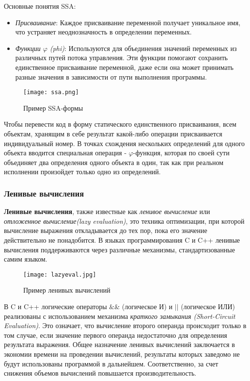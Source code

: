 Основные понятия SSA:
\begin{itemize}
    \item \textit{Присваивание}: Каждое присваивание переменной получает уникальное имя, что устраняет неоднозначность в определении переменных.
    \item \textit{Функции $\varphi$ (phi)}: Используются для объединения значений переменных из различных путей потока управления. Эти функции помогают сохранить единственное присваивание переменной, даже если она может принимать разные значения в зависимости от пути выполнения программы.
\end{itemize}

\begin{figure}[!htb]
    \centering
    \texttt{[image: ssa.png]}
    \caption{Пример SSA-формы}
\end{figure}

Чтобы перевести код в форму статического единственного присваивания, всем объектам, хранящим в себе результат какой-либо операции присваивается индивидуальный номер. В точках схождения нескольких определений для одного объекта вводится специальная операция - $\varphi$-функция, которая по своей сути объединяет два определения одного объекта в один, так как при реальном исполнении  произойдет только одно из определений.

\subsubsection{Ленивые вычисления}

\textbf{Ленивые вычисления}, также известные как \textit{ленивое вычисление} или \textit{отложенное вычисление(lazy evaluation)}, это техника оптимизации, при которой вычисление выражения откладывается до тех пор, пока его значение действительно не понадобится. В языках программирования C и C++ ленивые вычисления поддерживаются через различные механизмы, стандартизованные самим языком.

\begin{figure}[!htb]
    \centering
    \texttt{[image: lazyeval.jpg]}
    \caption{Пример ленивых вычислений}
    \label{lazyeval}
\end{figure}

В C и C++ логические операторы $\&\&$ (логическое И) и $||$ (логическое ИЛИ) реализованы с использованием механизма \textit{краткого замыкания (Short-Circuit Evaluation)}. Это означает, что вычисление второго операнда происходит только в том случае, если значение первого операнда недостаточно для определения результата выражения. Общее назначение ленивых вычислений заключается в экономии времени на проведении вычислений, результаты которых заведомо не будут использованы программой в дальнейшем. Соответственно, за счет снижения объемов вычислений повышается производительность. 

